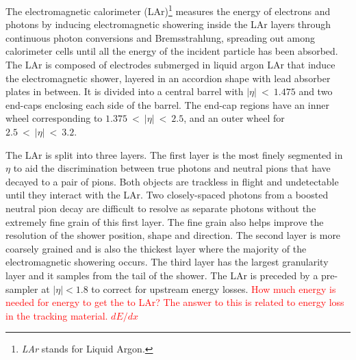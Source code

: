 
The electromagnetic calorimeter (LAr)\footnote{\textit{LAr} stands for Liquid Argon.} measures the energy of electrons and photons by inducing electromagnetic showering inside the LAr layers through continuous photon conversions and Bremsstrahlung, spreading out among calorimeter cells until all the energy of the incident particle has been absorbed.  The LAr is composed of electrodes submerged in liquid argon LAr that induce the electromagnetic shower, layered in an accordion shape with lead absorber plates in between. It is divided into a central barrel with $|\eta|~<~1.475$ and two end-caps enclosing each side of the barrel.  The end-cap regions have an inner wheel corresponding to $1.375~<~|\eta|~<~2.5$, and an outer wheel for $2.5~<~|\eta|~<~3.2$.  

The LAr is split into three layers.  The first layer is the most finely segmented in $\eta$ to aid the discrimination between true photons and neutral pions that have decayed to a pair of pions.  Both objects are trackless in flight and undetectable until they interact with the LAr.  Two closely-spaced photons from a boosted neutral pion decay are difficult to resolve as separate photons without the extremely fine grain of this first layer.  The fine grain also helps improve the resolution of the shower position, shape and direction.  The second layer is more coarsely grained and is also the thickest layer where the majority of the electromagnetic showering occurs.  The third layer has the largest granularity layer and it samples from the tail of the shower.  The LAr is preceded by a pre-sampler at $|\eta| < 1.8$ to correct for upstream energy losses.  \textcolor{red}{How much energy is needed for energy to get the to LAr?  The answer to this is related to energy loss in the tracking material. $dE/dx$}


